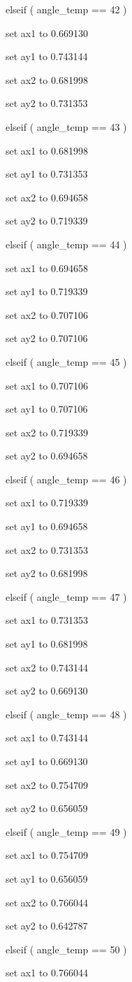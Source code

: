 \documentclass[
]{article}
\begin{document}
elseif ( angle\_temp == 42 )

set ax1 to 0.669130

set ay1 to 0.743144

set ax2 to 0.681998

set ay2 to 0.731353

elseif ( angle\_temp == 43 )

set ax1 to 0.681998

set ay1 to 0.731353

set ax2 to 0.694658

set ay2 to 0.719339

elseif ( angle\_temp == 44 )

set ax1 to 0.694658

set ay1 to 0.719339

set ax2 to 0.707106

set ay2 to 0.707106

elseif ( angle\_temp == 45 )

set ax1 to 0.707106

set ay1 to 0.707106

set ax2 to 0.719339

set ay2 to 0.694658

elseif ( angle\_temp == 46 )

set ax1 to 0.719339

set ay1 to 0.694658

set ax2 to 0.731353

set ay2 to 0.681998

elseif ( angle\_temp == 47 )

set ax1 to 0.731353

set ay1 to 0.681998

set ax2 to 0.743144

set ay2 to 0.669130

elseif ( angle\_temp == 48 )

set ax1 to 0.743144

set ay1 to 0.669130

set ax2 to 0.754709

set ay2 to 0.656059

elseif ( angle\_temp == 49 )

set ax1 to 0.754709

set ay1 to 0.656059

set ax2 to 0.766044

set ay2 to 0.642787

elseif ( angle\_temp == 50 )

set ax1 to 0.766044
\end{document}
